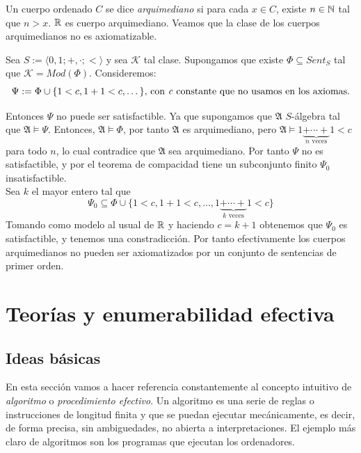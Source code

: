 \begin{example}
Un cuerpo ordenado $C$ se dice \textit{arquimediano} si para cada $x \in C$, existe $n \in \mathbb{N}$ tal que $n > x$. $\mathbb{R}$ es cuerpo arquimediano. Veamos que la clase de los cuerpos arquimedianos no es axiomatizable.

Sea $S := \langle 0, 1; +, \cdot; <\rangle$ y sea $\mathcal{K}$ tal clase. Supongamos que existe $\Phi \subseteq Sent_S$ tal que $\mathcal{K} = Mod(\Phi)$. Consideremos:
$$\Psi := \Phi \cup \{1 < c, 1+1<c, \dots\} \text{, con \textit{c} constante que no usamos en los axiomas.}$$

Entonces $\Psi$ no puede ser satisfactible. Ya que supongamos que $\mathfrak{A}$ $S$-álgebra tal que $\mathfrak{A}\vDash \Psi$. Entonces, $\mathfrak{A}\vDash \Phi$, por tanto $\mathfrak{A}$ es arquimediano, pero $\mathfrak{A} \vDash  1  \underbrace{+ \cdots +}_\text{$n$ veces} 1 < c$ para todo $n$, lo cual contradice que $\mathfrak{A}$ sea arquimediano. Por tanto $\Psi$ no es satisfactible, y por el teorema de compacidad tiene un subconjunto finito $\Psi_0$ insatisfactible.\\


Sea $k$ el mayor entero tal que
$$\Psi_0 \subseteq \Phi \cup \{1 < c,1+1<c, \dots, 1  \underbrace{+ \cdots +}_\text{$k$ veces} 1 < c\}$$
Tomando como modelo al usual de $\mathbb{R}$ y haciendo $c = k+1$ obtenemos que $\Psi_0$ es satisfactible, y tenemos una constradicción. Por tanto efectivamente los cuerpos arquimedianos no pueden ser axiomatizados por un conjunto de sentencias de primer orden.
\end{example}


\section{Teorías y enumerabilidad efectiva}

\subsection{Ideas básicas}

En esta sección vamos a hacer referencia constantemente al concepto intuitivo de \textit{algoritmo} o \textit{procedimiento efectivo}. Un algoritmo es una serie de reglas o instrucciones de longitud finita y que se puedan ejecutar mecánicamente, es decir, de forma precisa, sin ambiguedades, no abierta a interpretaciones. El ejemplo más claro de algoritmos son los programas que ejecutan los ordenadores.\\

